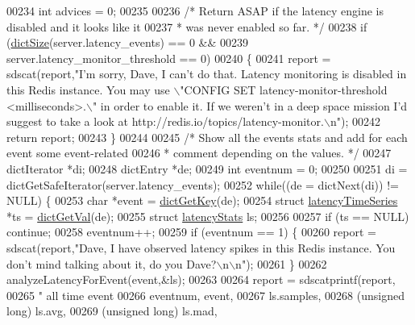 \begin{DoxyCode}
00234     \textcolor{keywordtype}{int} advices = 0;
00235 
00236     \textcolor{comment}{/* Return ASAP if the latency engine is disabled and it looks like it}
00237 \textcolor{comment}{     * was never enabled so far. */}
00238     \textcolor{keywordflow}{if} (\hyperlink{dict_8h_af193430dd3d5579a52b194512f72c1f0}{dictSize}(server.latency\_events) == 0 &&
00239         server.latency\_monitor\_threshold == 0)
00240     \{
00241         report = sdscat(report,\textcolor{stringliteral}{"I'm sorry, Dave, I can't do that. Latency monitoring is disabled in
       this Redis instance. You may use \(\backslash\)"CONFIG SET latency-monitor-threshold <milliseconds>.\(\backslash\)" in order to enable
       it. If we weren't in a deep space mission I'd suggest to take a look at
       http://redis.io/topics/latency-monitor.\(\backslash\)n"});
00242         \textcolor{keywordflow}{return} report;
00243     \}
00244 
00245     \textcolor{comment}{/* Show all the events stats and add for each event some event-related}
00246 \textcolor{comment}{     * comment depending on the values. */}
00247     dictIterator *di;
00248     dictEntry *de;
00249     \textcolor{keywordtype}{int} eventnum = 0;
00250 
00251     di = dictGetSafeIterator(server.latency\_events);
00252     \textcolor{keywordflow}{while}((de = dictNext(di)) != NULL) \{
00253         \textcolor{keywordtype}{char} *event = \hyperlink{dict_8h_a3271c334309904a3086deca94f96e46e}{dictGetKey}(de);
00254         \textcolor{keyword}{struct} \hyperlink{structlatencyTimeSeries}{latencyTimeSeries} *ts = \hyperlink{dict_8h_ae8d2cc391873b2bea2b87c4f80f43120}{dictGetVal}(de);
00255         \textcolor{keyword}{struct} \hyperlink{structlatencyStats}{latencyStats} ls;
00256 
00257         \textcolor{keywordflow}{if} (ts == NULL) \textcolor{keywordflow}{continue};
00258         eventnum++;
00259         \textcolor{keywordflow}{if} (eventnum == 1) \{
00260             report = sdscat(report,\textcolor{stringliteral}{"Dave, I have observed latency spikes in this Redis instance. You
       don't mind talking about it, do you Dave?\(\backslash\)n\(\backslash\)n"});
00261         \}
00262         analyzeLatencyForEvent(event,&ls);
00263 
00264         report = sdscatprintf(report,
00265             \textcolor{stringliteral}{"%
       all time event %
00266             eventnum, event,
00267             ls.samples,
00268             (\textcolor{keywordtype}{unsigned} \textcolor{keywordtype}{long}) ls.avg,
00269             (\textcolor{keywordtype}{unsigned} \textcolor{keywordtype}{long}) ls.mad,
}
\end{DoxyCode}
